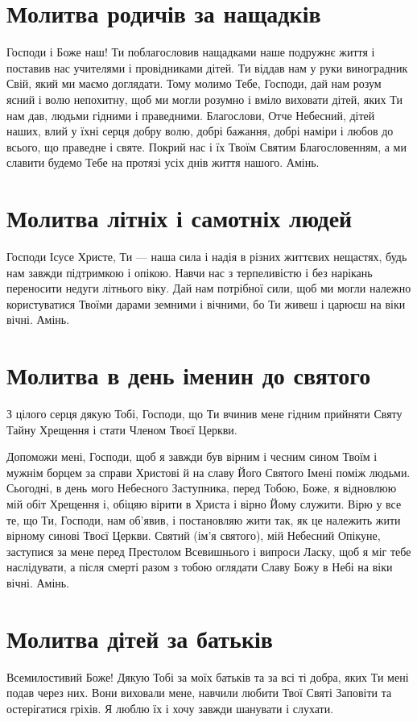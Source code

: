 \documentclass[chapters.tex]{subfiles}
\begin{document}
\section{Молитва родичів за нащадків}
Господи і Боже наш! Ти поблагословив нащадками наше подружнє життя і поставив нас учителями і провідниками дітей. Ти віддав нам у руки виноградник Свій, який ми маємо доглядати. Тому молимо Тебе, Господи, дай нам розум ясний і волю непохитну, щоб ми могли розумно і вміло виховати дітей, яких Ти нам дав, людьми гідними і праведними. Благослови, Отче Небесний, дітей наших, влий у їхні серця добру волю, добрі бажання, добрі наміри і любов до всього, що праведне і святе. Покрий нас і їх Твоїм Святим Благословенням, а ми славити будемо Тебе на протязі усіх днів життя нашого. Амінь.

\section{Молитва літніх і самотніх людей}
Господи Ісусе Христе, Ти — наша сила і надія в різних життєвих нещастях, будь нам завжди підтримкою і опікою. Навчи нас з терпеливістю і без нарікань переносити недуги літнього віку. Дай нам потрібної сили, щоб ми могли належно користуватися Твоїми дарами земними і вічними, бо Ти живеш і царюєш на віки вічні. Амінь.

\section{Молитва в день іменин до святого}
З цілого серця дякую Тобі, Господи, що Ти вчинив мене гідним прийняти Святу Тайну Хрещення і стати Членом Твоєї Церкви.

Допоможи мені, Господи, щоб я завжди був вірним і чесним сином Твоїм і мужнім борцем за справи Христові й на славу Його Святого Імені поміж людьми. Сьогодні, в день мого Небесного Заступника, перед Тобою, Боже, я відновлюю мій обіт Хрещення і, обіцяю вірити в Христа і вірно Йому служити. Вірю у все те, що Ти, Господи, нам об’явив, і постановляю жити так, як це належить жити вірному синові Твоєї Церкви. Святий (ім’я святого), мій Небесний Опікуне, заступися за мене перед Престолом Всевишнього і випроси Ласку, щоб я міг тебе наслідувати, а після смерті разом з тобою оглядати Славу Божу в Небі на віки вічні. Амінь.

\section{Молитва дітей за батьків}
Всемилостивий Боже! Дякую Тобі за моїх батьків та за всі ті добра, яких Ти мені подав через них. Вони виховали мене, навчили любити Твої Святі Заповіти та остерігатися гріхів. Я люблю їх і хочу завжди шанувати і слухати.
\end{document}
